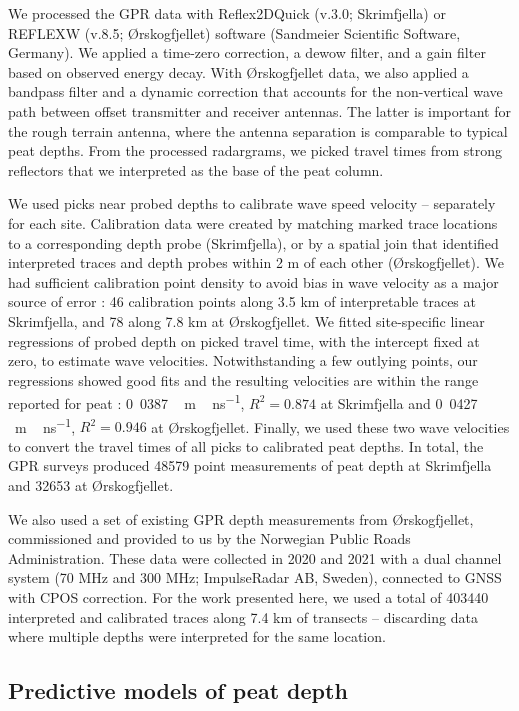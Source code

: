 \documentclass[soil, manuscript]{copernicus}
\begin{document}
We processed the GPR data with Reflex2DQuick (v.3.0; Skrimfjella) or REFLEXW (v.8.5; Ørskogfjellet) software (Sandmeier Scientific Software, Germany).
We applied a time-zero correction, a dewow filter, and a gain filter based on observed energy decay.
With Ørskogfjellet data, we also applied a bandpass filter and a dynamic correction that accounts for the non-vertical wave path between offset transmitter and receiver antennas.
The latter is important for the rough terrain antenna, where the antenna separation is comparable to typical peat depths.
From the processed radargrams, we picked travel times from strong reflectors that we interpreted as the base of the peat column.

We used picks near probed depths to calibrate wave speed velocity -- separately for each site.
Calibration data were created by matching marked trace locations to a corresponding depth probe (Skrimfjella), or by a spatial join that identified interpreted traces and depth probes within 2 m of each other (Ørskogfjellet).
We had sufficient calibration point density to avoid bias in wave velocity as a major source of error \citep{rosaDeterminingNumberManual2009}: 46 calibration points along 3.5 km of interpretable traces at Skrimfjella, and 78 along 7.8 km at Ørskogfjellet.
We fitted site-specific linear regressions of probed depth on picked travel time, with the intercept fixed at zero, to estimate wave velocities.
Notwithstanding a few outlying points, our regressions showed good fits and the resulting velocities are within the range reported for peat \citep{parsekianUncertaintyPeatVolume2012}: \unit{0.0387\,m\,ns^{-1}}, \(R^2 = 0.874\) at Skrimfjella and \unit{0.0427\,m\,ns^{-1}}, \(R^2 = 0.946\) at Ørskogfjellet.
Finally, we used these two wave velocities to convert the travel times of all picks to calibrated peat depths.
In total, the GPR surveys produced 48579 point measurements of peat depth at Skrimfjella and 32653 at Ørskogfjellet.

We also used a set of existing GPR depth measurements from Ørskogfjellet, commissioned and provided to us by the Norwegian Public Roads Administration.
These data were collected in 2020 and 2021 with a dual channel system (70 MHz and 300 MHz; ImpulseRadar AB, Sweden), connected to GNSS with CPOS correction.
For the work presented here, we used a total of 403440 interpreted and calibrated traces along 7.4 km of transects -- discarding data where multiple depths were interpreted for the same location.

\subsection{Predictive models of peat depth}
\end{document}
